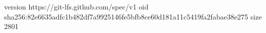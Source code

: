 version https://git-lfs.github.com/spec/v1
oid sha256:82e6635adfc1b482df7a9925146fe5bfb8ce60d181a11c5419fa2fabae38e275
size 2801
